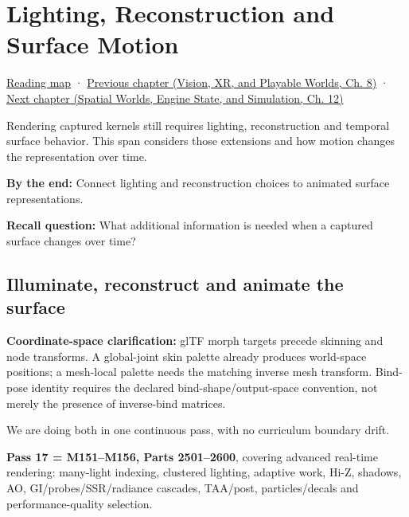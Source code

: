\chapter{Lighting, Reconstruction and Surface Motion}\label{04-visual-computing-ii-ch040-lighting-reconstruction-and-surface-motion}\hypertarget{04-visual-computing-ii-ch040}{}\label{stagechapter:04-visual-computing-ii-ch040}

\hyperref[volume-reading-map]{Reading map} · \href{../07-Vision-XR-and-Playable-Worlds/main.pdf\#nameddest=04-visual-computing-ii-ch039-tiling-ordering-and-compositing-at-scale}{Previous chapter (Vision, XR, and Playable Worlds, Ch. 8)} · \href{../05-Spatial-Worlds-Engine-State-and-Simulation/main.pdf\#nameddest=04-visual-computing-ii-ch041-per-vertex-and-per-corner-mesh-attributes}{Next chapter (Spatial Worlds, Engine State, and Simulation, Ch. 12)}

Rendering captured kernels still requires lighting, reconstruction and temporal surface behavior. This span considers those extensions and how motion changes the representation over time.

\textbf{By the end:} Connect lighting and reconstruction choices to animated surface representations.

\textbf{Recall question:} What additional information is needed when a captured surface changes over time?

\section{Illuminate, reconstruct and animate the surface}\label{04-visual-computing-ii-ch040-illuminate-reconstruct-and-animate-the-surface}

\textbf{Coordinate-space clarification:} glTF morph targets precede skinning and node transforms. A global-joint skin palette already produces world-space positions; a mesh-local palette needs the matching inverse mesh transform. Bind-pose identity requires the declared bind-shape/output-space convention, not merely the presence of inverse-bind matrices.

We are doing both in one continuous pass, with no curriculum boundary drift.

\textbf{Pass 17 = M151--M156, Parts 2501--2600}, covering advanced real-time rendering: many-light indexing, clustered lighting, adaptive work, Hi-Z, shadows, AO, GI/probes/SSR/radiance cascades, TAA/post, particles/decals and performance-quality selection.

